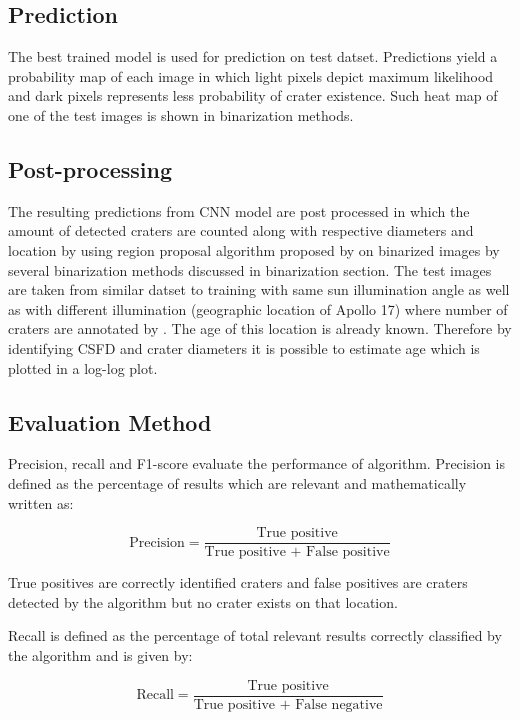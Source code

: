 \documentclass[11pt]{article}
\begin{document}
\subsection{Prediction}
The best trained model is used for prediction on test datset. Predictions yield a probability map of each image in which light pixels depict maximum likelihood and dark pixels represents less probability of crater existence. Such heat map of one of the test images is shown in binarization methods.

\subsection{Post-processing}
The resulting predictions from CNN model are post processed in which the amount of detected craters are counted along with respective diameters and location by using region proposal algorithm proposed by \cite{burger2009principles} on binarized images by several binarization methods discussed in binarization section. The test images are taken from similar datset to training with same sun illumination angle as well as with different illumination (geographic location of Apollo 17) where number of craters are annotated by \cite{dino2020}. The age of this location is already known. Therefore by identifying CSFD and crater diameters it is possible to estimate age which is plotted in a log-log plot.

\subsection{Evaluation Method}
Precision, recall and F1-score evaluate the performance of algorithm. Precision is defined as the percentage of results which are relevant and mathematically written as:

\begin{equation*}
\text{Precision} = \frac{\text{True positive}}{\text{True positive + False positive}}
\end{equation*}

True positives are correctly identified craters and false positives are craters detected by the algorithm but no crater exists on that location.

Recall is defined as the percentage of total relevant results correctly classified by the algorithm and is given by:

\begin{equation*}
\text{Recall} = \frac{\text{True positive}}{\text{True positive + False negative}}
\end{equation*}
\end{document}
